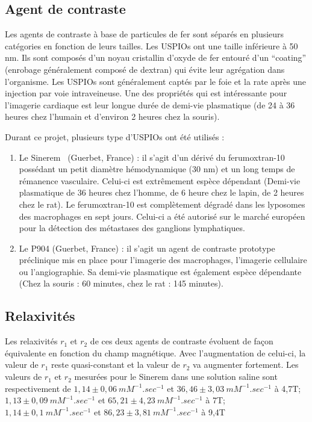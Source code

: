 \subsection{Agent de contraste}

Les agents de contraste à base de particules de fer sont séparés en plusieurs catégories en fonction de leurs tailles. Les USPIOs ont une taille inférieure à 50 nm. Ils sont composés d’un noyau cristallin d’oxyde de fer entouré d’un “coating” (enrobage généralement composé de dextran) qui évite leur agrégation dans l’organisme. Les USPIOs sont généralement captés par le foie et la rate après une injection par voie intraveineuse. Une des propriétés qui est intéressante pour l'imagerie cardiaque est leur longue durée de demi-vie plasmatique (de 24 à 36 heures chez l'humain et d'environ 2 heures chez la souris).

Durant ce projet, plusieurs type d'USPIOs ont été utilisés : 
\begin{enumerate}
\item Le Sinerem \textregistered \ (Guerbet, France) : il s'agit d'un dérivé du ferumoxtran-10 possédant un petit diamètre hémodynamique (30 nm) et un long temps de rémanence vasculaire. Celui-ci est extrêmement espèce dépendant (Demi-vie plasmatique de 36 heures chez l'homme, de 6 heure chez le lapin, de 2 heures chez le rat). Le ferumoxtran-10 est complètement dégradé dans les lyposomes des macrophages en sept jours. Celui-ci a été autorisé sur le marché européen pour la détection des métastases des ganglions lymphatiques.

\item Le P904 (Guerbet, France) : il s'agit un agent de contraste prototype préclinique mis en place pour l'imagerie des macrophages, l'imagerie cellulaire ou l'angiographie. Sa demi-vie plasmatique est également espèce dépendante (Chez la souris : 60 minutes, chez le rat : 145 minutes).
\end{enumerate}

\subsection{Relaxivités}

Les relaxivités $r_1$ et $r_2$ de ces deux agents de contraste évoluent de façon équivalente en fonction du champ magnétique. Avec l'augmentation de celui-ci, la valeur de $r_1$ reste quasi-constant et la valeur de $r_2$ va augmenter fortement. Les valeurs de $r_1$ et $r_2$ mesurées pour le Sinerem dans une solution saline sont respectivement de $1,14 \pm 0,06 \ mM^{-1}.sec^{-1}$ et $36,46 \pm 3,03 \ mM^{-1}.sec^{-1}$ à 4,7T; $1,13 \pm 0,09 \ mM^{-1}.sec^{-1}$ et $65,21 \pm 4,23 \ mM^{-1}.sec^{-1}$ à 7T; $1,14 \pm 0,1 \ mM^{-1}.sec^{-1}$ et $86,23 \pm 3,81 \ mM^{-1}.sec^{-1}$ à 9,4T

